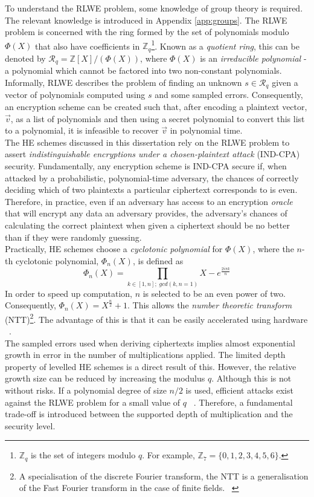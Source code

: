 To understand the RLWE problem, some knowledge of group theory is required. The relevant knowledge is introduced in Appendix \ref{app:groups}. The RLWE problem is concerned with the ring formed by the set of polynomials modulo $\Phi (X)$ that also have coefficients in $\mathbb{Z}_q$\footnote{$\mathbb{Z}_q$ is the set of integers modulo $q$. For example, $\mathbb{Z}_7 = \{0, 1, 2, 3, 4, 5, 6\}$.}. Known as a \textit{quotient ring}, this can be denoted by $\mathcal{R}_q = \mathbb{Z}[X] / (\Phi(X))$, where $\Phi(X)$ is an \textit{irreducible polynomial} - a polynomial which cannot be factored into two non-constant polynomials.
\smallskip \\ \indent
Informally, RLWE describes the problem of finding an unknown $s \in \mathcal{R}_q$ given a vector of polynomials computed using $s$ and some sampled errors. Consequently, an encryption scheme can be created such that, after encoding a plaintext vector, $\vec{v}$, as a list of polynomials and then using a secret polynomial to convert this list to a polynomial, it is infeasible to recover $\vec{v}$ in polynomial time.
\smallskip \\ \indent
The HE schemes discussed in this dissertation rely on the RLWE problem to assert \textit{indistinguishable encryptions under a chosen-plaintext attack} (IND-CPA) security. Fundamentally, any encryption scheme is IND-CPA secure if, when attacked by a probabilistic, polynomial-time adversary, the chances of correctly deciding which of two plaintexts a particular ciphertext corresponds to is even. Therefore, in practice, even if an adversary has access to an encryption \textit{oracle} that will encrypt any data an adversary provides, the adversary's chances of calculating the correct plaintext when given a ciphertext should be no better than if they were randomly guessing. 
\smallskip \\ \indent
Practically, HE schemes choose a \textit{cyclotonic polynomial} for $\Phi(X)$, where the $n$-th cyclotonic polynomial, $\Phi_n(X)$, is defined as
\begin{equation}
    \Phi_n(X) = \prod_{k \in [1, n]; \; gcd(k, n = 1)} X - e^\frac{2 i \pi k}{n}
\end{equation}
In order to speed up computation, $n$ is selected to be an even power of two. Consequently, $\Phi_n(X) = X^\frac{n}{2} + 1$. This allows the \textit{number theoretic transform} (NTT)\footnote{A specialisation of the discrete Fourier transform, the NTT is a generalisation of the Fast Fourier transform in the case of finite fields. ~\cite{NTT}}. The advantage of this is that it can be easily accelerated using hardware ~\cite{Hardware}.
\smallskip \\ \indent
The sampled errors used when deriving ciphertexts implies almost exponential growth in error in the number of multiplications applied. The limited depth property of levelled HE schemes is a direct result of this. However, the relative growth size can be reduced by increasing the modulus $q$. Although this is not without risks. If a polynomial degree of size $n/2$ is used, efficient attacks exist against the RLWE problem for a small value of $q$ ~\cite{HEStandard}. Therefore, a fundamental trade-off is introduced between the supported depth of multiplication and the security level.

